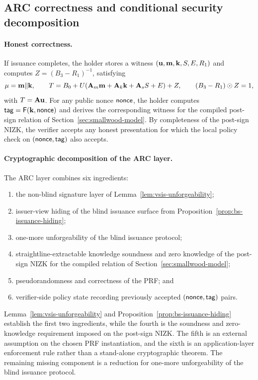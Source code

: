 \subsection{ARC correctness and conditional security decomposition}

\paragraph{Honest correctness.}
If issuance completes, the holder stores a witness \((\mathbf{u},\mathbf{m},\mathbf{k},S,E,R_1)\) and computes
\(Z=(B_3-R_1)^{-1}\), satisfying
\[
\mathbf{\mu}=\mathbf{m}\Vert \mathbf{k},
\qquad
T = B_0 + U(\mathbf{A}_m\mathbf{m} + \mathbf{A}_k\mathbf{k} + \mathbf{A}_s S + E) + Z,
\qquad
(B_3-R_1)\odot Z = 1,
\]
with \(T=\mathbf{A} \mathbf{u}\). For any public nonce \(\mathsf{nonce}\), the holder computes \(\mathsf{tag} = \mathsf{F}(\mathbf{k},\mathsf{nonce})\)
and derives the corresponding witness for the compiled post-sign relation of Section~\ref{sec:smallwood-model}. By
completeness of the post-sign NIZK, the verifier accepts any honest presentation for which the local policy check on
\((\mathsf{nonce},\mathsf{tag})\) also accepts.

\paragraph{Cryptographic decomposition of the ARC layer.}
The ARC layer combines six ingredients:
\begin{enumerate}[leftmargin=1.25em]
    \item the non-blind signature layer of Lemma~\ref{lem:vsis-unforgeability};
    \item issuer-view hiding of the blind issuance surface from Proposition~\ref{prop:bs-issuance-hiding};
    \item one-more unforgeability of the blind issuance protocol;
    \item straightline-extractable knowledge soundness and zero knowledge of the post-sign NIZK for the
    compiled relation of Section~\ref{sec:smallwood-model};
    \item pseudorandomness and correctness of the PRF; and
    \item verifier-side policy state recording previously accepted \((\mathsf{nonce},\mathsf{tag})\) pairs.
\end{enumerate}
Lemma~\ref{lem:vsis-unforgeability} and Proposition~\ref{prop:bs-issuance-hiding} establish the first two
ingredients, while the fourth is the soundness and zero-knowledge requirement imposed on the post-sign NIZK. The fifth
is an external assumption on the chosen PRF instantiation, and the sixth is an application-layer enforcement rule
rather than a stand-alone cryptographic theorem. The remaining missing component is a reduction for one-more
unforgeability of the blind issuance protocol.

